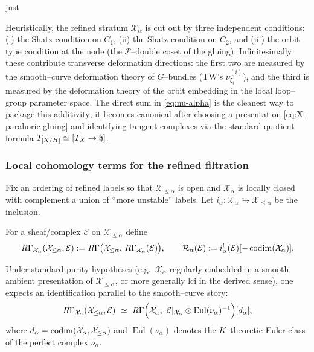 just \documentclass[12pt]{article}
\DeclareMathOperator{\Eul}{Eul}
\begin{document}
\begin{remark}
Heuristically, the refined stratum $\mathcal X_\alpha$ is cut out by three independent
conditions:
(i) the Shatz condition on $C_1$, (ii) the Shatz condition on $C_2$, and
(iii) the orbit--type condition at the node (the $\mathcal P$--double coset of the gluing).
Infinitesimally these contribute transverse deformation directions:
the first two are measured by the smooth--curve deformation theory of $G$--bundles
(TW's $\nu_{\xi_i}^{(i)}$), and the third is measured by the deformation theory of the
orbit embedding in the local loop--group parameter space.
The direct sum in \eqref{eq:nu-alpha} is the cleanest way to package this additivity;
it becomes canonical after choosing a presentation \eqref{eq:X-parahoric-gluing} and
identifying tangent complexes via the standard quotient formula
$T_{[X/H]}\simeq [T_X\to \mathfrak{h}]$.
\end{remark}

\subsubsection*{Local cohomology terms for the refined filtration}
Fix an ordering of refined labels so that $\mathcal X_{\le\alpha}$ is open and
$\mathcal X_\alpha$ is locally closed with complement a union of ``more unstable'' labels.
Let $i_\alpha:\mathcal X_\alpha\hookrightarrow \mathcal X_{\le\alpha}$ be the inclusion.

For a sheaf/complex $\mathcal E$ on $\mathcal X_{\le\alpha}$ define
\[
R\Gamma_{\mathcal X_\alpha}(\mathcal X_{\le\alpha},\mathcal E)
:=R\Gamma\bigl(\mathcal X_{\le\alpha},\,R\Gamma_{\mathcal X_\alpha}(\mathcal E)\bigr),
\qquad
\mathcal R_\alpha(\mathcal E):=i_\alpha^!(\mathcal E)[-\operatorname{codim}(\mathcal X_\alpha)].
\]

Under standard purity hypotheses (e.g.\ $\mathcal X_\alpha$ regularly embedded in a smooth
ambient presentation of $\mathcal X_{\le\alpha}$, or more generally lci in the derived sense),
one expects an identification parallel to the smooth--curve story:
\begin{equation}
\label{eq:localcoh-alpha}
R\Gamma_{\mathcal X_\alpha}(\mathcal X_{\le\alpha},\mathcal E)
\ \simeq\
R\Gamma\Bigl(\mathcal X_\alpha,\ \mathcal E|_{\mathcal X_\alpha}\otimes \Eul(\nu_\alpha)^{-1}\Bigr)[d_\alpha],
\end{equation}
where $d_\alpha=\operatorname{codim}(\mathcal X_\alpha,\mathcal X_{\le\alpha})$ and $\Eul(\nu_\alpha)$
denotes the $K$--theoretic Euler class of the perfect complex $\nu_\alpha$.
\end{document}
